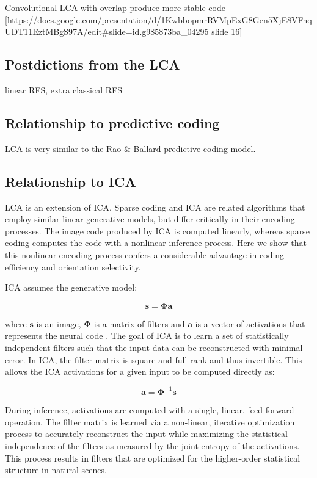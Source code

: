 Convolutional LCA with overlap produce more stable code [https://docs.google.com/presentation/d/1KwbbopmrRVMpExG8Gen5XjE8VFnqUDT11EztMBgS97A/edit#slide=id.g985873ba_04295 slide 16]

\subsection{Postdictions from the LCA}
linear RFS, extra classical RFS

\subsection{Relationship to predictive coding}
LCA is very similar to the Rao & Ballard predictive coding model.

\subsection{Relationship to ICA}
LCA is an extension of ICA.
Sparse coding and ICA are related algorithms that employ similar linear generative models, but differ critically in their encoding processes. The image code produced by ICA is computed linearly, whereas sparse coding computes the code with a nonlinear inference process. Here we show that this nonlinear encoding process confers a considerable advantage in coding efficiency and orientation selectivity.

ICA assumes the generative model:

\begin{equation}
\mathbf{s} = \mathbf{\Phi a}
\end{equation}

where $\mathbf{s}$ is an image, $\mathbf{\Phi}$ is a matrix of filters and $\mathbf{a}$ is a vector of activations that represents the neural code \cite{bell:1997gx}. The goal of ICA is to learn a set of statistically independent filters such that the input data can be reconstructed with minimal error. In ICA, the filter matrix is square and full rank and thus invertible. This allows the ICA activations for a given input to be computed directly as:

\begin{equation}
\mathbf{\hat{a}} = \mathbf{\Phi}^{-1}\mathbf{s}
\end{equation}

During inference, activations are computed with a single, linear, feed-forward operation. The filter matrix is learned via a non-linear, iterative optimization process to accurately reconstruct the input while maximizing the statistical independence of the filters as measured by the joint entropy of the activations. This process results in filters that are optimized for the higher-order statistical structure in natural scenes.

